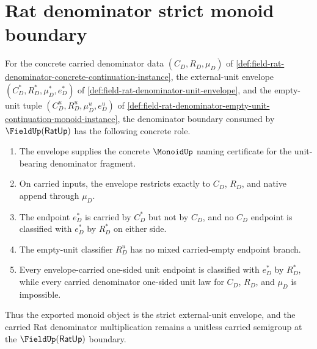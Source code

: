 \section{Rat denominator strict monoid boundary}
\label{sec:field-rat-denominator-strict-monoid-boundary}

\begin{theorem}
\label{thm:field-rat-denominator-envelope-strict-monoid-boundary}
For the concrete carried denominator data $(C_D,R_D,\mu_D)$ of
\autoref{def:field-rat-denominator-concrete-continuation-instance}, the
external-unit envelope $(C_D^\ast,R_D^\ast,\mu_D^\ast,e_D^\ast)$ of
\autoref{def:field-rat-denominator-unit-envelope}, and the empty-unit tuple
$(C_D^u,R_D^u,\mu_D^u,e_D^u)$ of
\autoref{def:field-rat-denominator-empty-unit-continuation-monoid-instance},
the denominator boundary consumed by $\FieldUp(\mathsf{RatUp})$ has the
following concrete role.
\begin{enumerate}
  \item The envelope supplies the concrete $\MonoidUp$ naming certificate for
  the unit-bearing denominator fragment.
  \item On carried inputs, the envelope restricts exactly to $C_D$, $R_D$, and
  native append through $\mu_D$.
  \item The endpoint $e_D^\ast$ is carried by $C_D^\ast$ but not by $C_D$, and
  no $C_D$ endpoint is classified with $e_D^\ast$ by $R_D^\ast$ on either
  side.
  \item The empty-unit classifier $R_D^u$ has no mixed carried-empty endpoint
  branch.
  \item Every envelope-carried one-sided unit endpoint is classified with
  $e_D^\ast$ by $R_D^\ast$, while every carried denominator one-sided unit law
  for $C_D$, $R_D$, and $\mu_D$ is impossible.
\end{enumerate}
Thus the exported monoid object is the strict external-unit envelope, and the
carried Rat denominator multiplication remains a unitless carried semigroup at
the $\FieldUp(\mathsf{RatUp})$ boundary.
\end{theorem}
